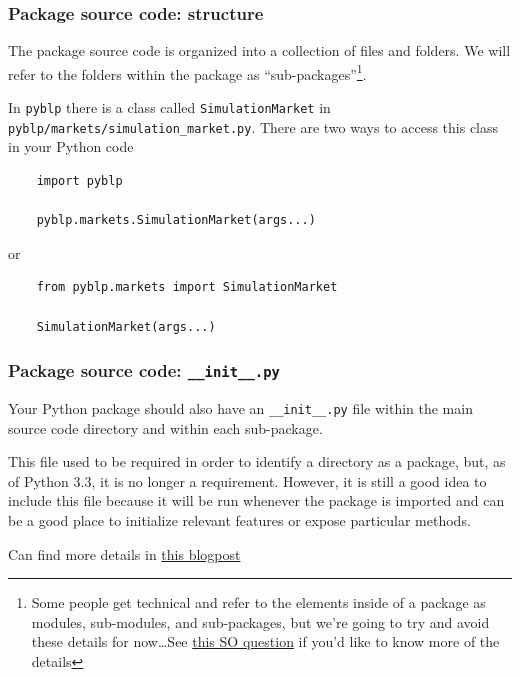 \documentclass[10pt]{beamer}
\begin{document}
  \begin{frame}[fragile] \frametitle{Package source code: structure}

    The package source code is organized into a collection of files and folders. We will
    refer to the folders within the package as ``sub-packages''\footnote{
    Some people get technical and refer to the elements inside of a package as modules,
    sub-modules, and sub-packages, but we're going to try and avoid these details for
    now\dots See
    \href{
    https://stackoverflow.com/questions/7948494/whats-the-difference-between-a-python-module-and-a-python-package
    }{this SO question} if you'd like to know more of the details}.

    In \texttt{pyblp} there is a class called \texttt{SimulationMarket} in
    \texttt{pyblp/markets/simulation\_market.py}. There are two ways to access this class in
    your Python code

    \begin{lstlisting}
    import pyblp

    pyblp.markets.SimulationMarket(args...)
    \end{lstlisting}

    or

    \begin{lstlisting}
    from pyblp.markets import SimulationMarket

    SimulationMarket(args...)
    \end{lstlisting}

  \end{frame}

  \begin{frame} \frametitle{Package source code: \texttt{\_\_init\_\_.py}}

    Your Python package should also have an \texttt{\_\_init\_\_.py} file within the main
    source code directory and within each sub-package.

    \vspace{0.25cm}

    This file used to be required in order to identify a directory as a package, but, as
    of Python 3.3, it is no longer a requirement. However, it is still a good idea to
    include this file because it will be run whenever the package is imported and can be
    a good place to initialize relevant features or expose particular methods.

    \vspace{0.25cm}

    Can find more details in
    \href{http://python-notes.curiousefficiency.org/en/latest/python_concepts/import_traps.html}{this blogpost}

  \end{frame}
\end{document}
